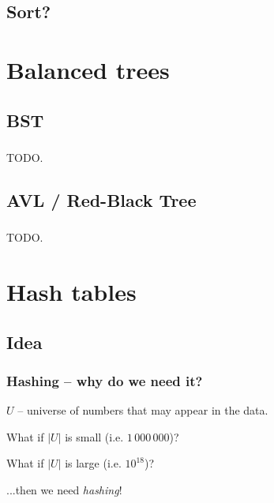 \documentclass{beamer}
\begin{document}
\subsection{Sort?}

\section{Balanced trees}

\subsection{BST}

\begin{frame}
    \frametitle{}
    TODO.
\end{frame}

\subsection{AVL / Red-Black Tree}

\begin{frame}
    \frametitle{}
    TODO.
\end{frame}

\section{Hash tables}

\subsection{Idea}

\begin{frame}
    \frametitle{Hashing -- why do we need it?}

    \pause
    \begin{block}{}
    $U$ -- universe of numbers that may appear in the data.
    \end{block}

    What if $|U|$ is small (i.e. $1\,000\,000$)? \pause

    \medskip
    What if $|U|$ is large (i.e. $10^{18}$)? \pause

    \medskip
    ...then we need \textit{hashing}!
\end{frame}
\end{document}
